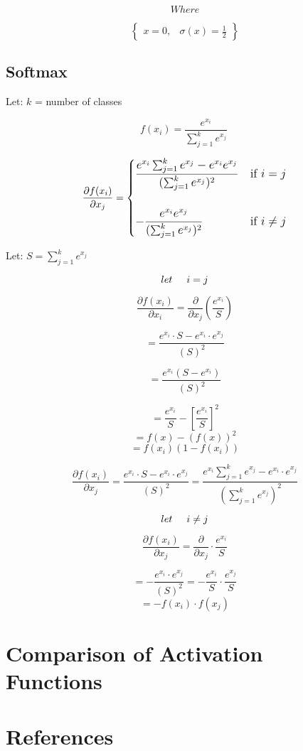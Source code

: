 \documentclass[12pt,a4paper]{article}
\begin{document}
\[
Where
\]

\[
\begin{Bmatrix}
    x = 0, & \sigma(x) = \frac{1}{2}
\end{Bmatrix}
\]

\newpage
\subsection{Softmax}
Let: \(k\) = number of classes

\[
f(x_i) = \frac{e^{x_i}}{\sum_{j=1}^{k} e^{x_j}}\
\]



\vspace{0.5cm}

\[
\large
\frac{\partial f(x_i)}{\partial x_j} = \begin{cases}
    \displaystyle\frac{e^{x_i} \sum_{j=1}^{k} e^{x_j} - e^{x_i} e^{x_j} }{( \sum_{j=1}^{k} e^{x_j})^2} & \text{if } i = j \\[2ex]\\
    \displaystyle- \frac{e^{x_i} e^{x_j}}{( \sum_{j=1}^{k} e^{x_j})^2} & \text{if } i \neq j
\end{cases}
\]

\vspace{0.5cm}
\large Let: \(S = \sum_{j=1}^{k} e^{x_j}\)

\[let \hspace{0.5cm} i = j\]

\[
\frac{\partial f(x_i)}{\partial x_i} = \frac{\partial}{\partial x_j}(\frac{e^{x_i}}{S})
\]

\vspace{0.5cm}

\[
= \frac{e^{x_i}\cdot S - e^{x_i} \cdot e^{x_j}}{(S)^2}
\]

\[
= \frac{e^{x_i}(S - e^{x_i})}{(S)^2}
\]

\[
= \frac{e^{x_i}}{S} - [\frac{e^{x_i}}{S}]^{2}
\]
\[
= f(x)-(f(x))^{2}
\]
\[
    = f(x_i)(1 - f(x_i))
\]

\[
\frac{\partial f(x_i)}{\partial x_j} = \frac{e^{x_i} \cdot S - e^{x_i} \cdot e^{x_j}}{(S)^2}
= \frac{e^{x_i} \sum_{j = 1}^{k} e^{x_j} - e^{x_i} \cdot e^{x_j}}{( \sum_{j = 1}^{k} e^{x_j})^{2}}
\]

\newpage
\[
let \hspace{0.5cm} i \neq j
\]

\[
\frac{\partial f(x_i)}{\partial x_j} = \frac{\partial}{\partial x_j} \cdot \frac{e^{x_i}}{S}
\]

\[
= - \frac{e^{x_i} \cdot e^{x_j}}{(S)^2} = -\frac{e^{x_i}}{S} \cdot \frac{e^{x_j}}{S}
\]
\[
= -f(x_i) \cdot f(x_j)
\]


\section{Comparison of Activation Functions}

\section{References}


\end{document}

